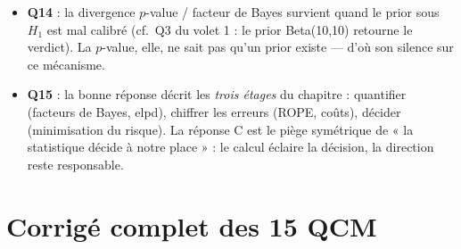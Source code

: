 \documentclass[11pt,a4paper]{article}
\begin{document}
\begin{piege}[Questions 14 et 15]
\begin{itemize}[leftmargin=4mm, itemsep=0.5mm]
  \item \textbf{Q14} : la divergence $p$-value / facteur de Bayes survient
        quand le prior sous $H_1$ est mal calibré (cf.\ Q3 du volet 1 : le
        prior Beta(10,10) retourne le verdict). La $p$-value, elle, ne sait
        pas qu'un prior existe --- d'où son silence sur ce mécanisme.
  \item \textbf{Q15} : la bonne réponse décrit les \emph{trois étages} du
        chapitre : quantifier (facteurs de Bayes, elpd), chiffrer les erreurs
        (ROPE, coûts), décider (minimisation du risque). La réponse C est le
        piège symétrique de « la statistique décide à notre place » : le
        calcul éclaire la décision, la direction reste responsable.
\end{itemize}
\end{piege}

\newpage
\section{Corrigé complet des 15 QCM}
\end{document}
